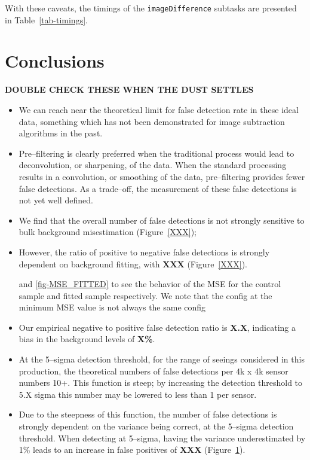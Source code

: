 \documentclass[prd, nofootinbib, floatfix, 11pt,tightenlines,times]{article}
\begin{document}
With these caveats, the timings of the {\tt imageDifference} subtasks
are presented in Table~\ref{tab-timings}.

\section{Conclusions}

{\bf DOUBLE CHECK THESE WHEN THE DUST SETTLES}

\begin{itemize}

\item We can reach near the theoretical limit for false detection rate
  in these ideal data, something which has not been demonstrated for
  image subtraction algorithms in the past.

\item Pre--filtering is clearly preferred when the traditional process
  would lead to deconvolution, or sharpening, of the data.  When the
  standard processing results in a convolution, or smoothing of the
  data, pre--filtering provides fewer false detections.  As a
  trade--off, the measurement of these false detections is not yet
  well defined.

\item We find that the overall number of false detections is not
  strongly sensitive to bulk background misestimation
  (Figure~\ref{XXX});

\item However, the ratio of positive to negative false detections is
  strongly dependent on background fitting, with {\bf XXX}
  (Figure~\ref{XXX}).


and \ref{fig-MSE_FITTED} to see the behavior of the MSE for the control sample and
fitted sample respectively.  We note that the config at the minimum MSE value is
not always the same config\item Our empirical negative to positive false detection ratio is {\bf
  X.X}, indicating a bias in the background levels of {\bf X\%}.

\item At the 5--sigma detection threshold, for the range of seeings
  considered in this production, the theoretical numbers of false
  detections per 4k x 4k sensor numbers 10+.  This function is steep;
  by increasing the detection threshold to 5.X sigma this number may
  be lowered to less than 1 per sensor.

\item Due to the steepness of this function, the number of false
  detections is strongly dependent on the variance being correct, at
  the 5--sigma detection threshold.  When detecting at 5--sigma,
  having the variance underestimated by 1\% leads to an increase
  in false positives of {\bf XXX} (Figure~\ref{}).


\end{itemize}
\end{document}
